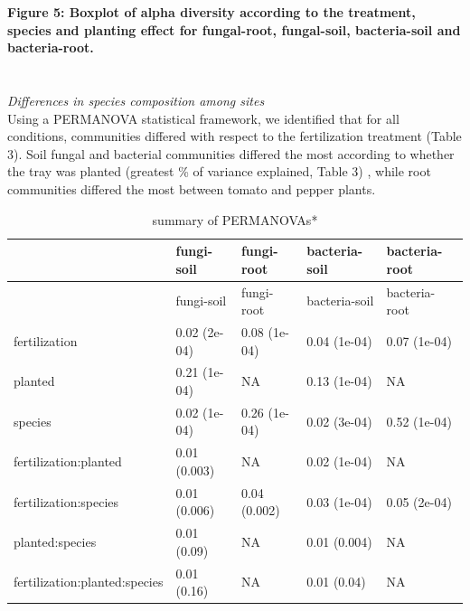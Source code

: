 \documentclass[11pt,]{article}
\begin{document}
\textbf{Figure 5: Boxplot of alpha diversity according to the treatment,
species and planting effect for fungal-root, fungal-soil, bacteria-soil
and bacteria-root.}\\
\hspace*{0.333em}\\
\hspace*{0.333em}\\
\emph{Differences in species composition among sites}\\
Using a PERMANOVA statistical framework, we identified that for all
conditions, communities differed with respect to the fertilization
treatment (Table 3). Soil fungal and bacterial communities differed the
most according to whether the tray was planted (greatest \% of variance
explained, Table 3) , while root communities differed the most between
tomato and pepper plants.

\begin{longtable}[]{@{}lllll@{}}
\caption{summary of PERMANOVAs*}\tabularnewline
\toprule
& fungi-soil & fungi-root & bacteria-soil & bacteria-root\tabularnewline
\midrule
\endfirsthead
\toprule
& fungi-soil & fungi-root & bacteria-soil & bacteria-root\tabularnewline
\midrule
\endhead
fertilization & 0.02 (2e-04) & 0.08 (1e-04) & 0.04 (1e-04) & 0.07
(1e-04)\tabularnewline
planted & 0.21 (1e-04) & NA & 0.13 (1e-04) & NA\tabularnewline
species & 0.02 (1e-04) & 0.26 (1e-04) & 0.02 (3e-04) & 0.52
(1e-04)\tabularnewline
fertilization:planted & 0.01 (0.003) & NA & 0.02 (1e-04) &
NA\tabularnewline
fertilization:species & 0.01 (0.006) & 0.04 (0.002) & 0.03 (1e-04) &
0.05 (2e-04)\tabularnewline
planted:species & 0.01 (0.09) & NA & 0.01 (0.004) & NA\tabularnewline
fertilization:planted:species & 0.01 (0.16) & NA & 0.01 (0.04) &
NA\tabularnewline
\bottomrule
\end{longtable}
\end{document}
